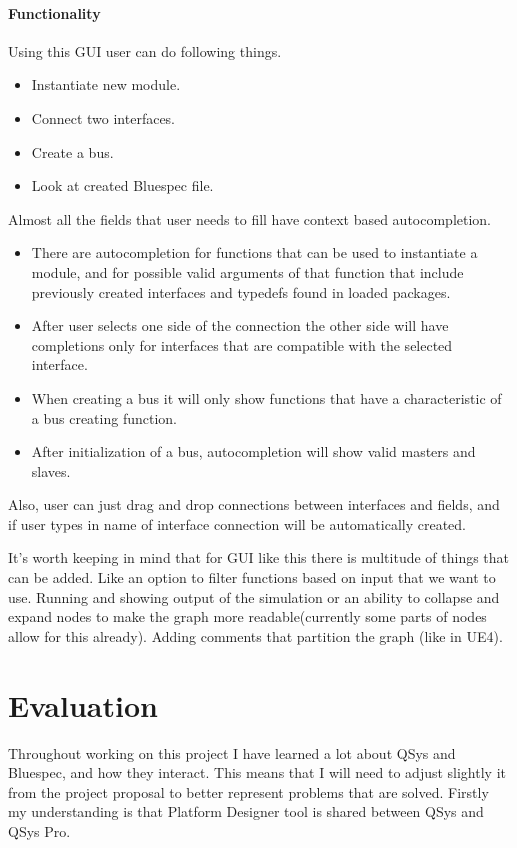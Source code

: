 \documentclass[14pt]{report}
\begin{document}
\subsubsection{Functionality}
Using this GUI user can do following things. 
\begin{itemize}
    \item Instantiate new module. 
    \item Connect two interfaces.
    \item Create a bus.
    \item Look at created Bluespec file.
\end{itemize}
Almost all the fields that user needs to fill have context based autocompletion. 
\begin{itemize}
    \item There are autocompletion for functions that can be used to instantiate a module, and for possible valid arguments of that function that include previously created interfaces and typedefs found in loaded packages.
    \item After user selects one side of the connection the other side will have completions only for interfaces that are compatible with the selected interface. 
    \item When creating a bus it will only show functions that have a characteristic of a bus creating function.
    \item After initialization of a bus, autocompletion will show valid masters and slaves. 
\end{itemize}
Also, user can just drag and drop connections between interfaces and fields, and if user types in name of interface connection will be automatically created.

\begin{tcolorbox}[title=Futher work]
    It's worth keeping in mind that for GUI like this there is multitude of things that can be added. Like an option to filter functions based on input that we want to use. Running and showing output of the simulation or an ability to collapse and expand nodes to make the graph more readable(currently some parts of nodes allow for this already). Adding comments that partition the graph (like in UE4).
\end{tcolorbox}

\chapter{Evaluation}
Throughout working on this project I have learned a lot about QSys and Bluespec, and how they interact. This means that I will need to adjust slightly it from the project proposal to better represent problems that are solved. Firstly my understanding is that Platform Designer tool is shared between QSys and QSys Pro.
\end{document}
